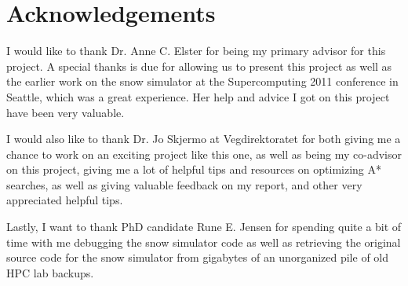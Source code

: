 \chapter*{Acknowledgements}

I would like to thank Dr. Anne C. Elster for being my primary advisor for this project. A special thanks is due for allowing us to present this project as well as the earlier work on the snow simulator at the Supercomputing 2011 conference in Seattle, which was a great experience. Her help and advice I got on this project have been very valuable. 

I would also like to thank Dr. Jo Skjermo at Vegdirektoratet for both giving me a chance to work on an exciting project like this one, as well as being my co-advisor on this project, giving me a lot of helpful tips and resources on optimizing A* searches, as well as giving valuable feedback on my report, and other very appreciated helpful tips.

Lastly, I want to thank PhD candidate Rune E. Jensen for spending quite a bit of time with me debugging the snow simulator code as well as retrieving the original source code for the snow simulator from gigabytes of an unorganized pile of old HPC lab backups.
